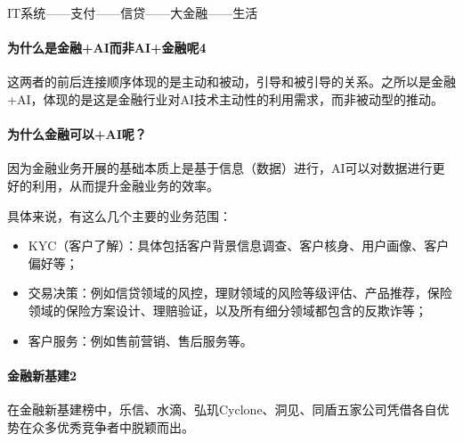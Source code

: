 \documentclass[letterpaper,11pt,english]{sphinxmanual}
\begin{document}
IT系统——支付——信贷——大金融——生活

\begin{center}\end{center} %
\begin{footnote}[235]\sphinxAtStartFootnote
{}
%
\end{footnote}


\paragraph{为什么是金融+AI而非AI+金融呢4\sphinxfootnotemark[236]}
\label{\detokenize{chapter_project/AI_Finance:aiai-4}}%
\begin{footnotetext}[236]\sphinxAtStartFootnote
{}
%
\end{footnotetext}\ignorespaces 
这两者的前后连接顺序体现的是主动和被动，引导和被引导的关系。之所以是金融+AI，体现的是这是金融行业对AI技术主动性的利用需求，而非被动型的推动。


\paragraph{为什么金融可以+AI呢？}
\label{\detokenize{chapter_project/AI_Finance:id2}}
因为金融业务开展的基础本质上是基于信息（数据）进行，AI可以对数据进行更好的利用，从而提升金融业务的效率。

具体来说，有这么几个主要的业务范围：
\begin{itemize}
\item {} 
KYC（客户了解）：具体包括客户背景信息调查、客户核身、用户画像、客户偏好等；

\item {} 
交易决策：例如信贷领域的风控，理财领域的风险等级评估、产品推荐，保险领域的保险方案设计、理赔验证，以及所有细分领域都包含的反欺诈等；

\item {} 
客户服务：例如售前营销、售后服务等。

\end{itemize}


\paragraph{金融新基建2\sphinxfootnotemark[237]}
\label{\detokenize{chapter_project/AI_Finance:id3}}%
\begin{footnotetext}[237]\sphinxAtStartFootnote
{}
%
\end{footnotetext}\ignorespaces 
在金融新基建榜中，乐信、水滴、弘玑Cyclone、洞见、同盾五家公司凭借各自优势在众多优秀竞争者中脱颖而出。
\end{document}

